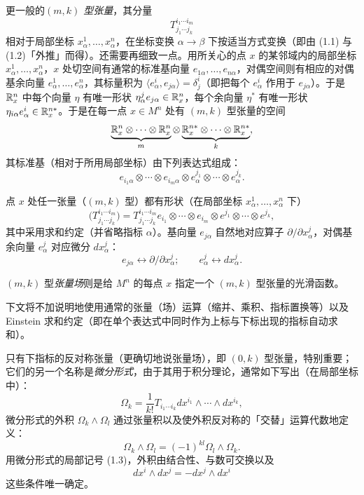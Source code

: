 更一般的\emph{$(m,k)$ 型张量}，其分量
\[
T^{i_1\cdots i_m}_{j_1\cdots j_k}
\]
相对于局部坐标 $x_\alpha^1,\ldots,x_\alpha^n$，在坐标变换 $\alpha\to\beta$ 下按适当方式变换（即由 (1.1) 与 (1.2)「外推」而得）。还需要再细致一点。用所关心的点 $x$ 的某邻域内的局部坐标 $x_\alpha^1,\ldots,x_\alpha^n$，$x$ 处切空间有通常的标准基向量 $e_{1\alpha},\ldots,e_{n\alpha}$，对偶空间则有相应的对偶基余向量 $e_\alpha^1,\ldots,e_\alpha^n$，其标量积为 $\langle e_\alpha^i,e_{j\alpha}\rangle=\delta_j^i$（即把每个 $e_\alpha^i$ 作用于 $e_{j\alpha}$）。于是 $\mathbb{R}^n_x$ 中每个向量 $\eta$ 有唯一形状 $\eta_\alpha^je_{j\alpha}\in\mathbb{R}^n_x$，每个余向量 $\eta^*$ 有唯一形状 $\eta_{i\alpha}e_\alpha^i\in\mathbb{R}_x^{n*}$。于是在每一点 $x\in M^n$ 处有 $(m,k)$ 型张量的空间
\[
\underbrace{\mathbb{R}^n_x\otimes\cdots\otimes\mathbb{R}^n_x}_{m}\otimes\underbrace{\mathbb{R}_x^{n*}\otimes\cdots\otimes\mathbb{R}_x^{n*}}_{k},
\]
其标准基（相对于所用局部坐标）由下列表达式组成：
\[
e_{i_1\alpha}\otimes\cdots\otimes e_{i_m\alpha}\otimes e_\alpha^{j_1}\otimes\cdots\otimes e_\alpha^{j_k}.
\]

点 $x$ 处任一张量（$(m,k)$ 型）都有形状（在局部坐标 $x_\alpha^1,\ldots,x_\alpha^n$ 下）
\[
\bigl(T^{i_1\cdots i_m}_{j_1\cdots j_k}\bigr)=T^{i_1\cdots i_m}_{j_1\cdots j_k}e_{i_1}\otimes\cdots\otimes e_{i_m}\otimes e^{j_1}\otimes\cdots\otimes e^{j_k},
\]
其中采用求和约定（并省略指标 $\alpha$）。基向量 $e_{j\alpha}$ 自然地对应算子 $\partial/\partial x_\alpha^j$，对偶基余向量 $e_\alpha^j$ 对应微分 $dx_\alpha^j$：
\[
e_{j\alpha}\leftrightarrow\partial/\partial x_\alpha^j;\qquad e_\alpha^j\leftrightarrow dx_\alpha^j.
\]

$(m,k)$ 型\emph{张量场}则是给 $M^n$ 的每点 $x$ 指定一个 $(m,k)$ 型张量的光滑函数。

下文将不加说明地使用通常的张量（场）运算（缩并、乘积、指标置换等）以及 Einstein 求和约定（即在单个表达式中同时作为上标与下标出现的指标自动求和）。

只有下指标的反对称张量（更确切地说张量场），即 $(0,k)$ 型张量，特别重要；它们的另一个名称是\emph{微分形式}，由于其用于积分理论，通常如下写出（在局部坐标中）：
\begin{equation}
\Omega_k=\frac1{k!}T_{i_1\cdots i_k}dx^{i_1}\wedge\cdots\wedge dx^{i_k}, \tag{1.3}
\end{equation}
微分形式的外积 $\Omega_k\wedge\Omega_l$ 通过张量积以及使外积反对称的「交替」运算代数地定义：
\[
\Omega_k\wedge\Omega_l=(-1)^{kl}\Omega_l\wedge\Omega_k.
\]
用微分形式的局部记号 (1.3)，外积由结合性、与数可交换以及
\begin{equation}
dx^i\wedge dx^j=-dx^j\wedge dx^i \tag{1.4}
\end{equation}
这些条件唯一确定。

